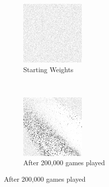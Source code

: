 
\begin{figure}
\center

	\begin{subfigure}[b]{0.4\textwidth}
	\includegraphics[width=\linewidth]{images/findings/round2/flipbook/random/checkpoint_000000.png}
	\caption{Starting Weights}
	\end{subfigure}
	~
	\begin{subfigure}[b]{0.4\textwidth}
	\includegraphics[width=\linewidth]{images/findings/round2/flipbook/random/checkpoint_200000.png}
	\caption{After 200,000 games played}
	\end{subfigure}


\end{figure}
